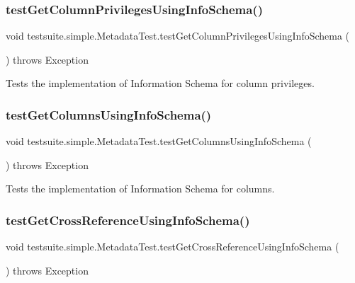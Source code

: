 \subsubsection{\texorpdfstring{test\+Get\+Column\+Privileges\+Using\+Info\+Schema()}{testGetColumnPrivilegesUsingInfoSchema()}}
{\footnotesize\ttfamily void testsuite.\+simple.\+Metadata\+Test.\+test\+Get\+Column\+Privileges\+Using\+Info\+Schema (\begin{DoxyParamCaption}{ }\end{DoxyParamCaption}) throws Exception}

Tests the implementation of Information Schema for column privileges. \mbox{\label{classtestsuite_1_1simple_1_1_metadata_test_a96ed59d14490afb4e9e39aa8414acd0a}} 
\subsubsection{\texorpdfstring{test\+Get\+Columns\+Using\+Info\+Schema()}{testGetColumnsUsingInfoSchema()}}
{\footnotesize\ttfamily void testsuite.\+simple.\+Metadata\+Test.\+test\+Get\+Columns\+Using\+Info\+Schema (\begin{DoxyParamCaption}{ }\end{DoxyParamCaption}) throws Exception}

Tests the implementation of Information Schema for columns. \mbox{\label{classtestsuite_1_1simple_1_1_metadata_test_a5c35cdbd777234219930a906ee096e93}} 
\subsubsection{\texorpdfstring{test\+Get\+Cross\+Reference\+Using\+Info\+Schema()}{testGetCrossReferenceUsingInfoSchema()}}
{\footnotesize\ttfamily void testsuite.\+simple.\+Metadata\+Test.\+test\+Get\+Cross\+Reference\+Using\+Info\+Schema (\begin{DoxyParamCaption}{ }\end{DoxyParamCaption}) throws Exception}

